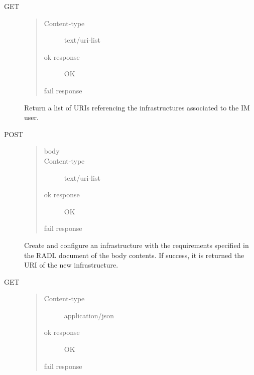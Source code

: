 \documentclass[letterpaper,10pt,english]{sphinxmanual}
\begin{document}
\begin{description}
\item[{GET }] \leavevmode\begin{quote}\begin{description}
\item[{Content-type}] \leavevmode
text/uri-list

\item[{ok response}]  OK

\item[{fail response}] 

\end{description}\end{quote}

Return a list of URIs referencing the infrastructures associated to the IM
user.

\item[{POST }] \leavevmode\begin{quote}\begin{description}
\item[{body}] \leavevmode
{}

\item[{Content-type}] \leavevmode
text/uri-list

\item[{ok response}]  OK

\item[{fail response}] 

\end{description}\end{quote}

Create and configure an infrastructure with the requirements specified in
the RADL document of the body contents. If success, it is returned the
URI of the new infrastructure.

\item[{GET }] \leavevmode\begin{quote}\begin{description}
\item[{Content-type}] \leavevmode
application/json

\item[{ok response}]  OK

\item[{fail response}] 


\end{description}
\end{quote}
\end{description}
\end{document}

